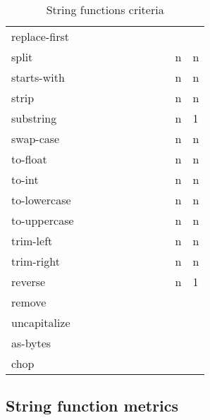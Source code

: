 \documentclass[anonymous,sigplan,review,11pt,nonacm,natbib=false]{acmart}
\begin{document}
\begin{table*}
\begin{tabular}{lllllllllll}
            replace-first &  &  &  &  &  &  &  &  &  & \\

            split &  &  &  &  &  & &  &  & n & n \\

            starts-with &  &  &  &  &  & &  &  & n & n \\

            strip &  &  &  &  &  & &  &  & n & n \\

            substring &  &  &  &  &  & &  &  & n & 1 \\

            swap-case &  &  &  &  &  & &  &  & n & n \\

            to-float &  &  &  &  &  & &  &  & n & n \\

            to-int &  &  &  &  &  & &  &  & n & n \\

            to-lowercase &  &  &  &  &  & &  &  & n & n \\

            to-uppercase &  &  &  &  &  & &  &  & n & n \\

            trim-left &  &  &  &  &  & &  &  & n & n \\

            trim-right &  &  &  &  &  & &  &  & n & n \\

            reverse &  &  &  &  &  & &  &  & n & 1 \\

            remove &  &  &  &  &  & &  &  &  & \\

            uncapitalize &  &  &  &  &  & &  &  &  & \\

            as-bytes &  &  &  &  &  & &  &  &  & \\

            chop &  &  &  &  &  & &  &  &  & \\ \hline
        \end{tabular}
        \caption{String functions criteria}
        \label{tab:my_label}
    \end{table*}

    \subsection{String function metrics}
\end{document}
